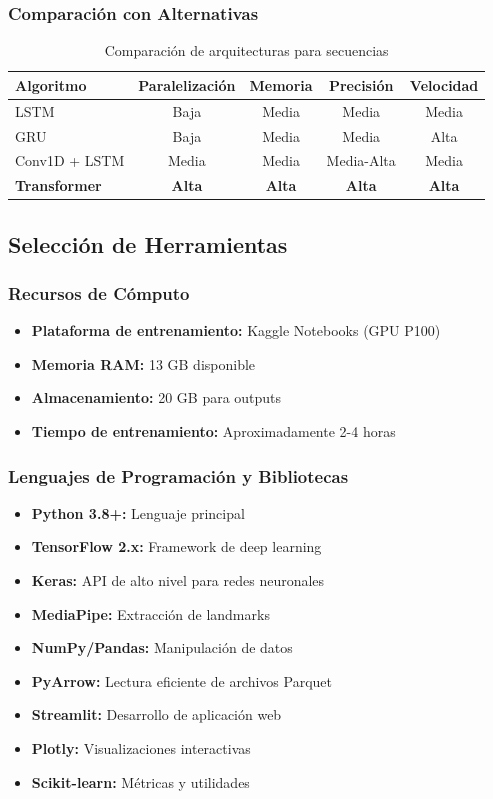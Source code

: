 \documentclass[12pt,a4paper]{article}
\begin{document}
\subsubsection{Comparación con Alternativas}
\begin{table}[H]
\centering
\begin{tabular}{|l|c|c|c|c|}
\hline
\textbf{Algoritmo} & \textbf{Paralelización} & \textbf{Memoria} & \textbf{Precisión} & \textbf{Velocidad} \\
\hline
LSTM & Baja & Media & Media & Media \\
\hline
GRU & Baja & Media & Media & Alta \\
\hline
Conv1D + LSTM & Media & Media & Media-Alta & Media \\
\hline
\textbf{Transformer} & \textbf{Alta} & \textbf{Alta} & \textbf{Alta} & \textbf{Alta} \\
\hline
\end{tabular}
\caption{Comparación de arquitecturas para secuencias}
\end{table}

\subsection{Selección de Herramientas}

\subsubsection{Recursos de Cómputo}
\begin{itemize}
    \item \textbf{Plataforma de entrenamiento:} Kaggle Notebooks (GPU P100)
    \item \textbf{Memoria RAM:} 13 GB disponible
    \item \textbf{Almacenamiento:} 20 GB para outputs
    \item \textbf{Tiempo de entrenamiento:} Aproximadamente 2-4 horas
\end{itemize}

\subsubsection{Lenguajes de Programación y Bibliotecas}
\begin{itemize}
    \item \textbf{Python 3.8+:} Lenguaje principal
    \item \textbf{TensorFlow 2.x:} Framework de deep learning
    \item \textbf{Keras:} API de alto nivel para redes neuronales
    \item \textbf{MediaPipe:} Extracción de landmarks
    \item \textbf{NumPy/Pandas:} Manipulación de datos
    \item \textbf{PyArrow:} Lectura eficiente de archivos Parquet
    \item \textbf{Streamlit:} Desarrollo de aplicación web
    \item \textbf{Plotly:} Visualizaciones interactivas
    \item \textbf{Scikit-learn:} Métricas y utilidades
\end{itemize}
\end{document}

